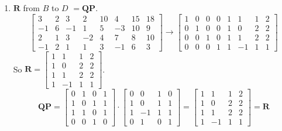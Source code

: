 \documentclass{article}
\theoremstyle{definition}
\begin{document}
\begin{prob}{22}
\begin{enumerate}[label=\alph*.)]
    		\item $ \mathbf{R} $ from $ B $ to $ D $ $ = \mathbf{QP} $.
    			\[
    				\left[
    					\begin{array}{cccc|cccc}
    						3 & 2 & 3 & 2 & 10 & 4 & 15 & 18 \\
    						-1 & 6 & -1 & 1 & 5 & -3 & 10 & 9 \\
    						2 & 1 & 3 & -2 & 4 & 7 & 8 & 10 \\
    						-1 & 2 & 1 & 1 & 3 & -1 & 6 & 3
    					\end{array}
    				\right]
    				\longrightarrow
    				\left[
    					\begin{array}{cccc|cccc}
    						1 & 0 & 0 & 0 & 1 & 1 & 1 & 2 \\
    						0 & 1 & 0 & 0 & 1 & 0 & 2 & 2 \\
    						0 & 0 & 1 & 0 & 1 & 1 & 2 & 2 \\
    						0 & 0 & 0 & 1 & 1 & -1 & 1 & 1
    					\end{array}
    				\right]
    			\]
    			So $ \mathbf{R} = \begin{bmatrix} 1 & 1 & 1 & 2 \\ 1 & 0 & 2 & 2 \\ 1 & 1 & 2 & 2 \\ 1 & -1 & 1 & 1 \end{bmatrix} $.
    			\[
    				\mathbf{QP} = \begin{bmatrix} 0 & 1 & 0 & 1 \\ 1 & 0 & 1 & 1 \\ 1 & 1 & 0 & 1 \\ 0 & 0 & 1 & 0 \end{bmatrix} \cdot \begin{bmatrix} 0 & 0 & 1 & 0 \\ 1 & 0 & 1 & 1 \\ 1 & -1 & 1 & 1 \\ 0 & 1 & 0 & 1 \end{bmatrix} = \begin{bmatrix} 1 & 1 & 1 & 2 \\ 1 & 0 & 2 & 2 \\ 1 & 1 & 2 & 2 \\ 1 & -1 & 1 & 1 \end{bmatrix} = \mathbf{R}
    			\]
    	\end{enumerate}
    \end{prob}
    
    
    
    
    
    
    
\end{document}
